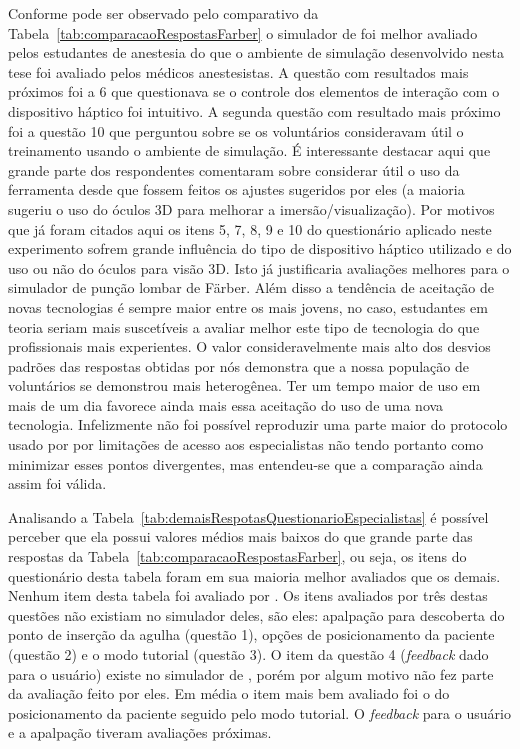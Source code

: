 Conforme pode ser observado pelo comparativo da Tabela~\ref{tab:comparacaoRespostasFarber} o simulador de \textcite{Farber2009} foi melhor avaliado pelos estudantes de anestesia do que o ambiente de simulação desenvolvido nesta tese foi avaliado pelos médicos anestesistas. A questão com resultados mais próximos foi a 6 que questionava se o controle dos elementos de interação com o dispositivo háptico foi intuitivo. A segunda questão com resultado mais próximo foi a questão 10 que perguntou sobre se os voluntários consideravam útil o treinamento usando o ambiente de simulação. É interessante destacar aqui que grande parte dos respondentes comentaram sobre considerar útil o uso da ferramenta desde que fossem feitos os ajustes sugeridos por eles (a maioria sugeriu o uso do óculos 3D para melhorar a imersão/visualização). Por motivos que já foram citados aqui os itens 5, 7, 8, 9 e 10 do questionário aplicado neste experimento sofrem grande influência do tipo de dispositivo háptico utilizado e do uso ou não do óculos para visão 3D. Isto já justificaria avaliações melhores para o simulador de punção lombar de Färber. Além disso a tendência de aceitação de novas tecnologias é sempre maior entre os mais jovens, no caso, estudantes em teoria seriam mais suscetíveis a avaliar melhor este tipo de tecnologia do que profissionais mais experientes. O valor consideravelmente mais alto dos desvios padrões das respostas obtidas por nós demonstra que a nossa população de voluntários se demonstrou mais heterogênea. Ter um tempo maior de uso em mais de um dia favorece ainda mais essa aceitação do uso de uma nova tecnologia. Infelizmente não foi possível reproduzir uma parte maior do protocolo usado por \textcite{Farber2009} por limitações de acesso aos especialistas não tendo portanto como minimizar esses pontos divergentes, mas entendeu-se que a comparação ainda assim foi válida.

Analisando a Tabela~\ref{tab:demaisRespotasQuestionarioEspecialistas} é possível perceber que ela possui valores médios mais baixos do que grande parte das respostas da Tabela~\ref{tab:comparacaoRespostasFarber}, ou seja, os itens do questionário desta tabela foram em sua maioria melhor avaliados que os demais. Nenhum item desta tabela foi avaliado por \textcite{Farber2009}. Os itens avaliados por três destas questões não existiam no simulador deles, são eles: apalpação para descoberta do ponto de inserção da agulha (questão 1), opções de posicionamento da paciente (questão 2) e o modo tutorial (questão 3). O item da questão 4 (\textit{feedback} dado para o usuário) existe no simulador de \textcite{Farber2009}, porém por algum motivo não fez parte da avaliação feito por eles. Em média o item mais bem avaliado foi o do posicionamento da paciente seguido pelo modo tutorial. O \textit{feedback} para o usuário e a apalpação tiveram avaliações próximas.